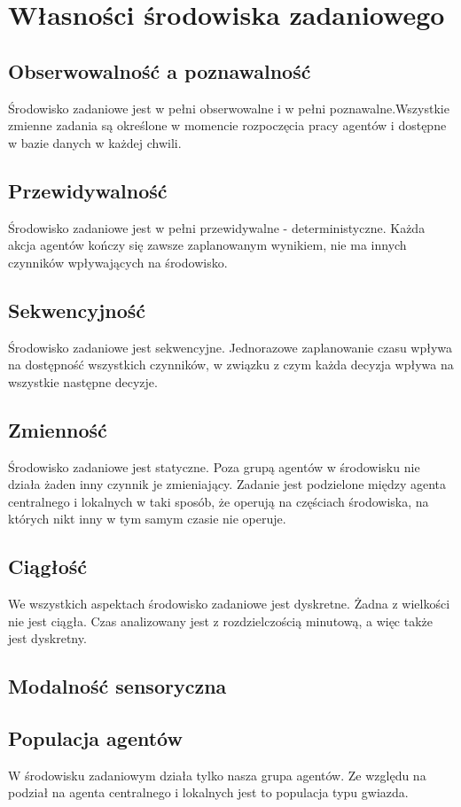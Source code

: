 \section{Własności środowiska zadaniowego}
\subsection{Obserwowalność a poznawalność}
Środowisko zadaniowe jest w pełni obserwowalne i w pełni poznawalne.Wszystkie zmienne zadania są określone w momencie
 rozpoczęcia pracy agentów i dostępne w bazie danych w każdej chwili.
 
\subsection{Przewidywalność}
Środowisko zadaniowe jest w pełni przewidywalne - deterministyczne. Każda akcja agentów kończy się zawsze zaplanowanym
 wynikiem, nie ma innych czynników wpływających na środowisko.

\subsection{Sekwencyjność}
Środowisko zadaniowe jest sekwencyjne. Jednorazowe zaplanowanie czasu wpływa na dostępność wszystkich czynników,
w związku z czym każda decyzja wpływa na wszystkie następne decyzje.

\subsection{Zmienność}
Środowisko zadaniowe jest statyczne. Poza grupą agentów w środowisku nie działa żaden inny czynnik je zmieniający.
Zadanie jest podzielone między agenta centralnego i lokalnych w taki sposób, że operują na częściach środowiska, na których
nikt inny w tym samym czasie nie operuje.

\subsection{Ciągłość}
We wszystkich aspektach środowisko zadaniowe jest dyskretne. Żadna z wielkości nie jest ciągła. Czas analizowany jest
z rozdzielczością minutową, a więc także jest dyskretny.

\subsection{Modalność sensoryczna}

\subsection{Populacja agentów}
W środowisku zadaniowym działa tylko nasza grupa agentów. Ze względu na podział na agenta centralnego i lokalnych
jest to populacja typu gwiazda.